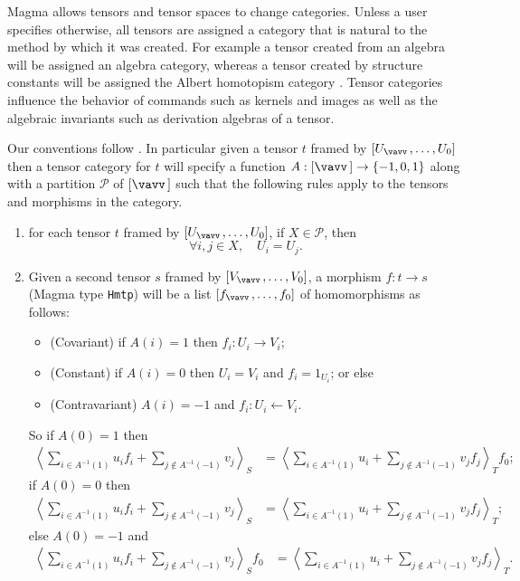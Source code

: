Magma allows tensors and tensor spaces to change categories. 
Unless a user specifies otherwise,
all tensors are assigned a category that is natural to the method
by which it was created.
For example a tensor created from an algebra will be assigned an 
algebra category, whereas a tensor created by structure constants
will be assigned the Albert homotopism category \cite{Albert:Fundamentals}.  
Tensor categories influence
the behavior of commands such as kernels and images  
as well as the algebraic invariants such as derivation algebras of a tensor.  

Our conventions follow \cite{Wilson:division}.  In particular given
a tensor $t$ framed by $[U_{\vav},\dots,U_0]$ then a tensor category for
$t$ will specify a function $A:[\vav]\to \{-1,0,1\}$ along with
a partition $\mathcal{P}$ of $[\vav]$ such that the following 
rules apply to the tensors and morphisms in the category.
\begin{enumerate}
\item for each tensor $t$ framed by $[U_{\vav},\dots,U_0]$, if
$X\in\mathcal{P}$, then 
$$\forall i,j\in X,\quad U_i=U_j.$$

\item Given a second tensor $s$ framed by $[V_{\vav},\dots,V_0]$,
a morphism $f:t\to s$ (Magma type {\tt Hmtp}) will be a list
$[f_{\vav},\dots,f_0]$ of homomorphisms as follows:
\begin{itemize}
\item (Covariant) if $A(i)=1$ then $f_i:U_i\to V_i$;
\item (Constant) if $A(i)=0$ then $U_i=V_i$ and $f_i=1_{U_i}$; or else
\item (Contravariant) $A(i)=-1$ and $f_i:U_i\leftarrow V_i$.
\end{itemize}
So if $A(0)=1$ then
\begin{align*}
	\left\langle \sum_{i\in A^{-1}(1)} u_i f_i
		+\sum_{j\not\in A^{-1}(-1)} v_j\right\rangle_S
		& = \left\langle  \sum_{i\in A^{-1}(1)} u_i 
		+\sum_{j\not\in A^{-1}(-1)} v_j f_j\right\rangle_T f_0;
\end{align*}
if $A(0)=0$ then
\begin{align*}
	\left\langle \sum_{i\in A^{-1}(1)} u_i f_i
		+\sum_{j\not\in A^{-1}(-1)} v_j\right\rangle_S
		& = \left\langle  \sum_{i\in A^{-1}(1)} u_i 
		+\sum_{j\not\in A^{-1}(-1)} v_j f_j\right\rangle_T;
\end{align*}
else $A(0)=-1$ and 
\begin{align*}
	\left\langle \sum_{i\in A^{-1}(1)} u_i f_i
		+\sum_{j\not\in A^{-1}(-1)} v_j\right\rangle_S f_0
		& = \left\langle  \sum_{i\in A^{-1}(1)} u_i 
		+\sum_{j\not\in A^{-1}(-1)} v_j f_j\right\rangle_T.
\end{align*}
\end{enumerate}

